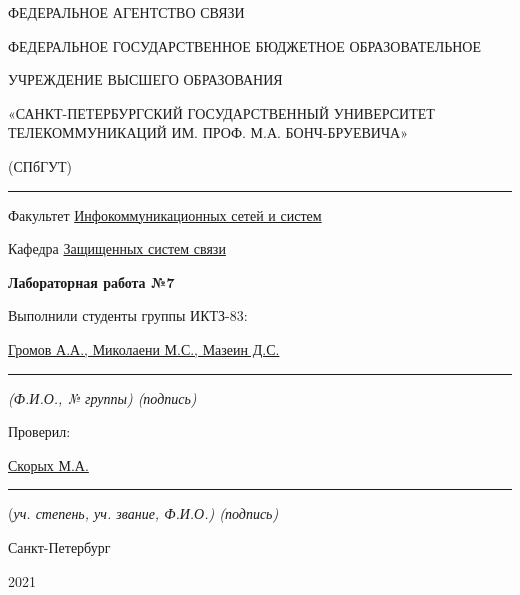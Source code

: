 \documentclass[a4paper,14pt]{extarticle}
\begin{document}
    \begin{center}
        \thispagestyle{empty}
        \begin{singlespace}
        ФЕДЕРАЛЬНОЕ АГЕНТСТВО СВЯЗИ

        ФЕДЕРАЛЬНОЕ ГОСУДАРСТВЕННОЕ БЮДЖЕТНОЕ ОБРАЗОВАТЕЛЬНОЕ

        УЧРЕЖДЕНИЕ ВЫСШЕГО ОБРАЗОВАНИЯ

        «САНКТ-ПЕТЕРБУРГСКИЙ ГОСУДАРСТВЕННЫЙ УНИВЕРСИТЕТ ТЕЛЕКОММУНИКАЦИЙ ИМ. ПРОФ. М.А. БОНЧ-БРУЕВИЧА»

        (СПбГУТ)
        \end{singlespace}
        \vspace{-1ex}
        \rule{\textwidth}{0.4pt}
        \vspace{-5ex}

        Факультет \underline{Инфокоммуникационных сетей и систем}

        Кафедра \underline{Защищенных систем связи}
        \vspace{10ex}

        \textbf{Лабораторная работа №7}\\
        


    \end{center}
    \vspace{4ex}
    \begin{flushright}
    \parbox{10 cm}{
    \begin{flushleft}
        Выполнили студенты группы ИКТЗ-83:

        \underline{Громов А.А., Миколаени М.С., Мазеин Д.С.} \hfill \rule[-0.85ex]{0.1\textwidth}{0.6pt}

        \footnotesize \textit{ (Ф.И.О., № группы) \hfill (подпись)} \normalsize

        Проверил:

        \underline{Скорых М.А.} \hfill \rule[-0.85ex]{0.1\textwidth}{0.6pt}

        (\footnotesize \textit{уч. степень, уч. звание, Ф.И.О.) \hfill (подпись)} \normalsize

    \end{flushleft}
    }
    \end{flushright}
    \begin{center}
        \vfill
        Санкт-Петербург

        2021

    \end{center}
    \newpage
\end{document}

